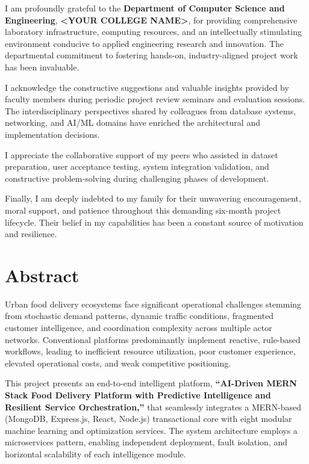 \documentclass[12pt,a4paper]{report}
\newcommand{\ProjectTitle}{AI-Driven MERN Stack Food Delivery Platform with Predictive Intelligence and Resilient Service Orchestration}
\newcommand{\DepartmentName}{Department of Computer Science and Engineering}
\newcommand{\CollegeName}{<YOUR COLLEGE NAME>}
\begin{document}
\vspace{0.3cm}
I am profoundly grateful to the \textbf{\DepartmentName}, \textbf{\CollegeName}, for providing comprehensive laboratory infrastructure, computing resources, and an intellectually stimulating environment conducive to applied engineering research and innovation. The departmental commitment to fostering hands-on, industry-aligned project work has been invaluable.

\vspace{0.3cm}
I acknowledge the constructive suggestions and valuable insights provided by faculty members during periodic project review seminars and evaluation sessions. The interdisciplinary perspectives shared by colleagues from database systems, networking, and AI/ML domains have enriched the architectural and implementation decisions.

\vspace{0.3cm}
I appreciate the collaborative support of my peers who assisted in dataset preparation, user acceptance testing, system integration validation, and constructive problem-solving during challenging phases of development.

\vspace{0.3cm}
Finally, I am deeply indebted to my family for their unwavering encouragement, moral support, and patience throughout this demanding six-month project lifecycle. Their belief in my capabilities has been a constant source of motivation and resilience.

\chapter*{Abstract}

Urban food delivery ecosystems face significant operational challenges stemming from stochastic demand patterns, dynamic traffic conditions, fragmented customer intelligence, and coordination complexity across multiple actor networks. Conventional platforms predominantly implement reactive, rule-based workflows, leading to inefficient resource utilization, poor customer experience, elevated operational costs, and weak competitive positioning.

This project presents an end-to-end intelligent platform, \textbf{``\ProjectTitle,''} that seamlessly integrates a MERN-based (MongoDB, Express.js, React, Node.js) transactional core with eight modular machine learning and optimization services. The system architecture employs a microservices pattern, enabling independent deployment, fault isolation, and horizontal scalability of each intelligence module.
\end{document}

